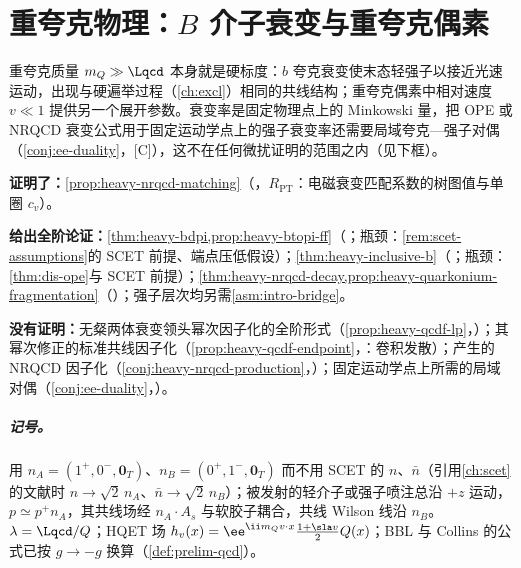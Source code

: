\chapter{重夸克物理：$B$ 介子衰变与重夸克偶素}\label{ch:heavy}

重夸克质量 $m_Q\gg\Lqcd$ 本身就是硬标度：$b$ 夸克衰变使末态轻强子以接近光速运动，出现与硬遍举过程（\cref{ch:excl}）相同的共线结构；重夸克偶素中相对速度 $v\ll1$ 提供另一个展开参数。衰变率是固定物理点上的 Minkowski 量，把 OPE 或 NRQCD 衰变公式用于固定运动学点上的强子衰变率还需要局域夸克—强子对偶（\cref{conj:ee-duality}，[C]），这不在任何微扰证明的范围之内（见下框）。

\begin{tcolorbox}[enhanced,breakable,title=本章证明了什么／没有证明什么,fonttitle=\bfseries,
  colback=gray!3!white,colframe=gray!55!black,boxrule=0.6pt,arc=2pt,
  left=5pt,right=5pt,top=3pt,bottom=3pt,before skip=6pt,after skip=6pt]
\textbf{证明了：}\cref{prop:heavy-nrqcd-matching}（\tagR，$R_{\mathrm{PT}}$：电磁衰变匹配系数的树图值与单圈 $c_v$）。\par
\textbf{给出全阶论证：}\cref{thm:heavy-bdpi,prop:heavy-btopi-ff}（\tagA；瓶颈：\cref{rem:scet-assumptions}的 SCET 前提、端点压低假设）；\cref{thm:heavy-inclusive-b}（\tagA；瓶颈：\cref{thm:dis-ope}与 SCET 前提）；\cref{thm:heavy-nrqcd-decay,prop:heavy-quarkonium-fragmentation}（\tagA）；强子层次均另需\cref{asm:intro-bridge}。\par
\textbf{没有证明：}无粲两体衰变领头幂次因子化的全阶形式（\cref{prop:heavy-qcdf-lp}，\tagP）；其幂次修正的标准共线因子化（\cref{prop:heavy-qcdf-endpoint}，\tagV：卷积发散）；产生的 NRQCD 因子化（\cref{conj:heavy-nrqcd-production}，\tagC）；固定运动学点上所需的局域对偶（\cref{conj:ee-duality}，\tagC）。
\end{tcolorbox}

\paragraph{记号。}
用 $n_A=(1^+,0^-,\mathbf 0_T)$、$n_B=(0^+,1^-,\mathbf 0_T)$ 而不用 SCET 的 $n$、$\bar n$（引用\cref{ch:scet}的文献时 $n\to\sqrt2\,n_A$、$\bar n\to\sqrt2\,n_B$）；被发射的轻介子或强子喷注总沿 $+z$ 运动，$p\simeq p^+n_A$，其共线场经 $n_A\cdot A_s$ 与软胶子耦合，共线 Wilson 线沿 $n_B$。$\lambda=\Lqcd/Q$；HQET 场 $h_v(x)=\ee^{\ii m_Qv\cdot x}\frac{1+\sla v}{2}Q(x)$；BBL 与 Collins 的公式已按 $g\to-g$ 换算（\cref{def:prelim-qcd}）。

